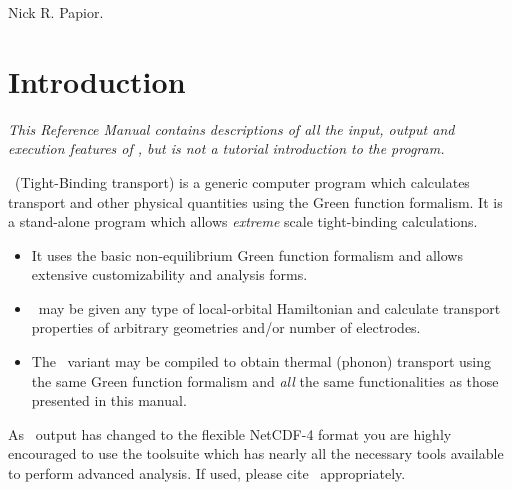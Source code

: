 Nick R. Papior.


\tableofcontents

\newpage

\section{Introduction}

\textit{This Reference Manual contains descriptions of all the input,
    output and execution features of \tbtrans, but is not a tutorial
    introduction to the program.}

\tbtrans\ (Tight-Binding transport) is a generic computer program
which calculates transport and other physical quantities using the
Green function formalism. 
%
It is a stand-alone program which allows \emph{extreme} scale
tight-binding calculations. 
\begin{itemize}
  
  \item%
  It uses the basic non-equilibrium Green function formalism and
  allows extensive customizability and analysis forms.

  \item%
  \tbtrans\ may be given any type of local-orbital Hamiltonian and
  calculate transport properties of arbitrary geometries and/or number
  of electrodes. 

  \item%
  The \phtrans\ variant may be compiled to obtain thermal (phonon)
  transport using the same Green function formalism and \emph{all} the
  same functionalities as those presented in this manual.

\end{itemize}
As \tbtrans\ output has changed to the flexible NetCDF-4 format you
are highly encouraged to use the \sisl\cite{sisl} toolsuite which has
nearly all the necessary tools available to perform advanced
analysis. If used, please cite \sisl\ appropriately.

